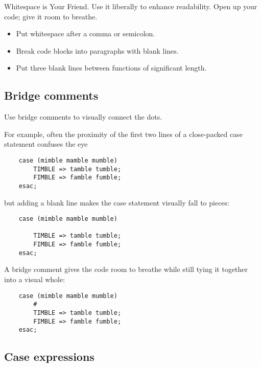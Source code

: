 Whitespace is Your Friend.  Use it liberally to enhance readability. 
Open up your code; give it room to breathe.

\begin{itemize}
\item Put whitespace after a comma or semicolon.
\item Break code blocks into paragraphs with blank lines.
\item Put three blank lines between functions of significant length.
\end{itemize}


\subsection{Bridge comments}

Use bridge comments to visually connect the dots. 

For example, often the proximity of the first two lines 
of a close-packed case statement confuses the 
eye

\begin{verbatim}
    case (mimble mamble mumble)
        TIMBLE => tamble tumble;
        FIMBLE => famble fumble;
    esac;
\end{verbatim}

but adding a blank line makes the case 
statement visually fall to pieces: 

\begin{verbatim}
    case (mimble mamble mumble)

        TIMBLE => tamble tumble;
        FIMBLE => famble fumble;
    esac;
\end{verbatim}

A bridge comment gives the code room 
to breathe while still tying it together into 
a visual whole: 

\begin{verbatim}
    case (mimble mamble mumble)
        #
        TIMBLE => tamble tumble;
        FIMBLE => famble fumble;
    esac;
\end{verbatim}



\subsection{Case expressions}

